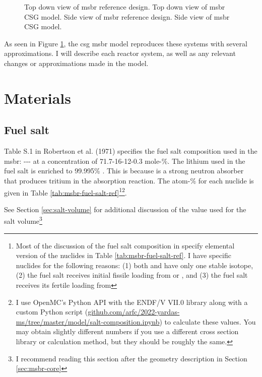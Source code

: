 \begin{figure}[htpb]
{        \label{fig:msbr-model-xz}
    }
    \caption[Full views of MSBR]{
         Top down view of \Gls{msbr} reference design.
         Top down view of \Gls{msbr} CSG model.
         Side view of \Gls{msbr} reference design.
         Side view of \Gls{msbr} CSG model.
    }
    \label{fig:msbr-overview}
\end{figure}

As seen in Figure \ref{fig:msbr-overview}, the \Gls{csg} \Gls{msbr}
model reproduces these systems with several approximations. I will
describe each reactor system, as well as any relevant changes or
approximations made in the model.

\section{Materials}
\label{sec:msbr-materials}

\subsection{Fuel salt}
\label{sub:msbr-fuel-salt}
Table S.1 in Robertson et al. (1971) \cite{robertson_conceptual_1971} specifies the fuel salt
composition used in the \Gls{msbr}:
--- at a concentration of
71.7-16-12-0.3 mole-\%. The lithium used in the fuel salt is enriched to
99.995\% . This is because  is a strong neutron absorber
that produces tritium in the absorption reaction. The atom-\% for each nuclide is
given in Table \ref{tab:msbr-fuel-salt-ref}\footnote{Most of the discussion of
the fuel salt composition in 
\cite{robertson_conceptual_1971}
specify elemental version of the nuclides in Table \ref{tab:msbr-fuel-salt-ref}.
I have specific nuclides for the following reasons: (1) both  and
 have only one stable isotope, (2) the fuel salt receives initial fissile
loading from  or , and (3) the fuel salt receives its
fertile loading from }\footnote{I use OpenMC's Python API with the
ENDF/V VII.0 library along with a custom Python script
(\url{github.com/arfc/2022-yardas-ms/tree/master/model/salt-composition.ipynb})
to calculate these values. You may obtain slightly different numbers if you use
a different cross section library or calculation method, but they should  be
roughly the same.}.

See Section \ref{sec:salt-volume} for additional discussion of the value used
for the salt volume\footnote{I recommend reading this section after the geometry
description in Section \ref{sec:msbr-core}}

